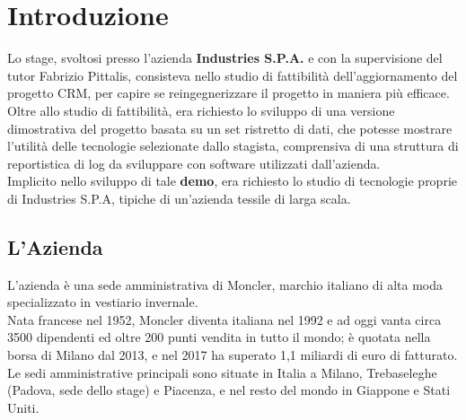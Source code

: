 \pagestyle{fancy}
\fancyhf{}
\fancyhead{}
\thispagestyle{fancy}
\fancyhead[RO, LE] {\thepage}
\fancyfoot{}

\section{Introduzione}
Lo stage, svoltosi presso l'azienda \textbf{Industries S.P.A.} e con la supervisione del tutor Fabrizio Pittalis, consisteva nello studio di fattibilità dell'aggiornamento del progetto CRM, per capire se reingegnerizzare il progetto in maniera più efficace.\\
Oltre allo studio di fattibilità, era richiesto lo sviluppo di una versione dimostrativa del progetto basata su un set ristretto di dati, che potesse mostrare l'utilità delle tecnologie selezionate dallo stagista, comprensiva di una struttura di reportistica di log da sviluppare con software utilizzati dall'azienda.\\
Implicito nello sviluppo di tale \textbf{demo}, era richiesto lo studio di tecnologie proprie di Industries S.P.A, tipiche di un'azienda tessile di larga scala.

\subsection{L'Azienda}
L'azienda è una sede amministrativa di Moncler, marchio italiano di alta moda specializzato in vestiario invernale.\\
Nata francese nel 1952, Moncler diventa italiana nel 1992 e ad oggi vanta circa 3500 dipendenti ed oltre 200 punti vendita in tutto il mondo; è quotata nella borsa di Milano dal 2013, e nel 2017 ha superato 1,1 miliardi di euro di fatturato.\\
Le sedi amministrative principali sono situate in Italia a Milano, Trebaseleghe (Padova, sede dello stage) e Piacenza, e nel resto del mondo in Giappone e Stati Uniti.

